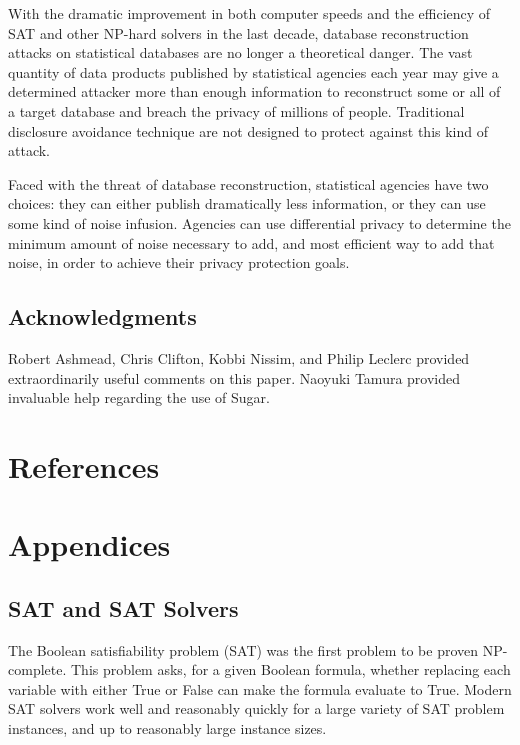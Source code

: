 \documentclass[runningheads]{llncs}
\begin{document}
With the dramatic improvement in both computer speeds and the
efficiency of SAT and other NP-hard solvers in the last decade, database reconstruction
attacks on statistical databases are no longer a theoretical
danger. The vast quantity of data products published by statistical
agencies each year may give a determined attacker more than enough
information to reconstruct some or all of a target database and breach
the privacy of millions of people. Traditional disclosure avoidance
technique are not designed to protect against this kind of attack.

Faced with the threat of database reconstruction, statistical agencies
have two choices: they can either publish dramatically less
information, or they can use some kind of noise infusion.  Agencies
can use differential privacy to determine the minimum
amount of noise necessary to add, and most efficient way to add that
noise, in order to achieve their privacy protection goals.

\subsection{Acknowledgments}
Robert Ashmead, Chris Clifton, Kobbi Nissim, and Philip Leclerc
provided extraordinarily useful
comments on this paper. Naoyuki Tamura provided invaluable help
regarding the use of Sugar.

\section{References}




\section{Appendices}

\subsection{SAT and SAT Solvers}

The Boolean satisfiability problem (SAT) was the first
problem to be proven NP-complete\cite{cooklevin}. This problem asks,
for a given Boolean formula, whether replacing each variable with
either True or False can make the formula evaluate to True.  Modern SAT
solvers work well and reasonably quickly for a large variety of SAT
problem instances, and up to reasonably large instance sizes. 
\end{document}
